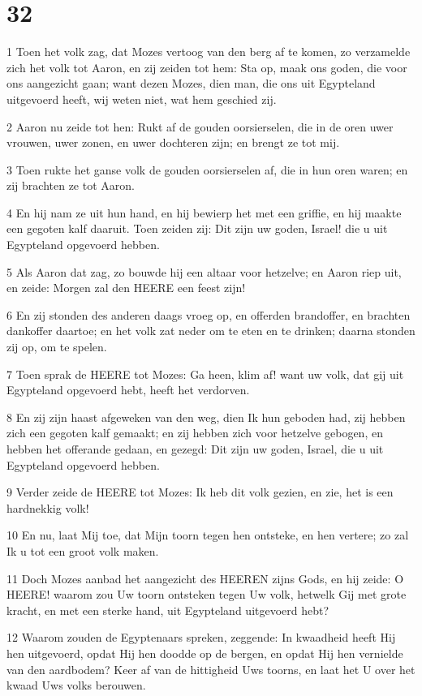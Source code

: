 \chapter{32}

\par 1 Toen het volk zag, dat Mozes vertoog van den berg af te komen, zo verzamelde zich het volk tot Aaron, en zij zeiden tot hem: Sta op, maak ons goden, die voor ons aangezicht gaan; want dezen Mozes, dien man, die ons uit Egypteland uitgevoerd heeft, wij weten niet, wat hem geschied zij.
\par 2 Aaron nu zeide tot hen: Rukt af de gouden oorsierselen, die in de oren uwer vrouwen, uwer zonen, en uwer dochteren zijn; en brengt ze tot mij.
\par 3 Toen rukte het ganse volk de gouden oorsierselen af, die in hun oren waren; en zij brachten ze tot Aaron.
\par 4 En hij nam ze uit hun hand, en hij bewierp het met een griffie, en hij maakte een gegoten kalf daaruit. Toen zeiden zij: Dit zijn uw goden, Israel! die u uit Egypteland opgevoerd hebben.
\par 5 Als Aaron dat zag, zo bouwde hij een altaar voor hetzelve; en Aaron riep uit, en zeide: Morgen zal den HEERE een feest zijn!
\par 6 En zij stonden des anderen daags vroeg op, en offerden brandoffer, en brachten dankoffer daartoe; en het volk zat neder om te eten en te drinken; daarna stonden zij op, om te spelen.
\par 7 Toen sprak de HEERE tot Mozes: Ga heen, klim af! want uw volk, dat gij uit Egypteland opgevoerd hebt, heeft het verdorven.
\par 8 En zij zijn haast afgeweken van den weg, dien Ik hun geboden had, zij hebben zich een gegoten kalf gemaakt; en zij hebben zich voor hetzelve gebogen, en hebben het offerande gedaan, en gezegd: Dit zijn uw goden, Israel, die u uit Egypteland opgevoerd hebben.
\par 9 Verder zeide de HEERE tot Mozes: Ik heb dit volk gezien, en zie, het is een hardnekkig volk!
\par 10 En nu, laat Mij toe, dat Mijn toorn tegen hen ontsteke, en hen vertere; zo zal Ik u tot een groot volk maken.
\par 11 Doch Mozes aanbad het aangezicht des HEEREN zijns Gods, en hij zeide: O HEERE! waarom zou Uw toorn ontsteken tegen Uw volk, hetwelk Gij met grote kracht, en met een sterke hand, uit Egypteland uitgevoerd hebt?
\par 12 Waarom zouden de Egyptenaars spreken, zeggende: In kwaadheid heeft Hij hen uitgevoerd, opdat Hij hen doodde op de bergen, en opdat Hij hen vernielde van den aardbodem? Keer af van de hittigheid Uws toorns, en laat het U over het kwaad Uws volks berouwen.
